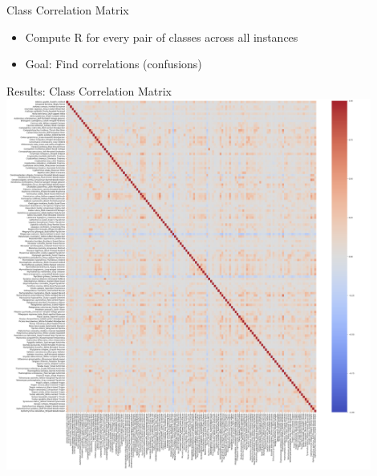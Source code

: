 \begin{frame}{Class Correlation Matrix}
    \begin{itemize}
        \item Compute R for every pair of classes across all instances
        \item Goal: Find correlations (confusions)
    \end{itemize}    
\end{frame}

\begin{frame}{Results: Class Correlation Matrix}
    \centering
    \includegraphics[height=0.9\textheight,width=0.9\textwidth,keepaspectratio]{images/no_filter.png}   
\end{frame}


